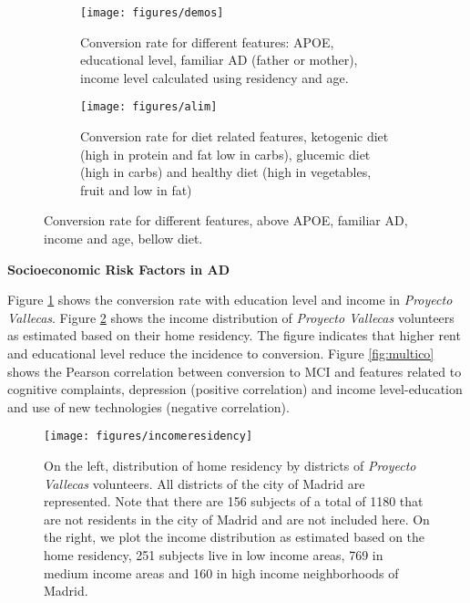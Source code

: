 \documentclass[11pt]{article}
\theoremstyle{definition}
\theoremstyle{remark}
\begin{document}
\begin{figure}[H]
    \centering
    \begin{subfigure}[t]{\textwidth}
        \centering
        \texttt{[image: figures/demos]}
        \caption{Conversion rate for different features: APOE, educational level, familiar AD (father or mother), income level calculated using residency and age.}

    \end{subfigure}
    
    \begin{subfigure}[t]{\textwidth}
        \centering
        \texttt{[image: figures/alim]}
        \caption{Conversion rate for diet related features, ketogenic diet (high in protein and fat low in carbs), glucemic diet (high in carbs) and healthy diet (high in vegetables, fruit and low in fat)}
    \end{subfigure}%
    \caption{Conversion rate for different features, above APOE, familiar AD, income and age, bellow diet.} \label{fig:demosalime}
\end{figure}

\textbf{Socioeconomic Risk Factors in AD}

Figure \ref{fig:demosalime} shows the conversion rate with education level and income in \emph{Proyecto Vallecas}. 
Figure \ref{fig:incomeresidency} shows the income distribution of \emph{Proyecto Vallecas} volunteers as estimated based on their home residency. The figure indicates that higher rent and educational level reduce the incidence to conversion. Figure \ref{fig:multico} shows the Pearson correlation between conversion to MCI and features related to cognitive complaints, depression (positive correlation) and income level-education and use of new technologies (negative correlation).

\begin{figure}[H]
        \centering
        \texttt{[image: figures/incomeresidency]}
        \caption{On the left, distribution of home residency by districts of \emph{Proyecto Vallecas} volunteers. All districts of the city of Madrid are represented. Note that there are 156 subjects of a total of 1180 that are not residents in the city of Madrid and are not included here. On the right, we plot the income distribution as estimated based on the home residency, 251 subjects live in low income areas, 769 in medium income areas and 160 in high income neighborhoods of Madrid.
        } \label{fig:incomeresidency}
\end{figure}
\end{document}
